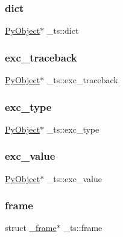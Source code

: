 \subsubsection{\texorpdfstring{dict}{dict}}
{\footnotesize\ttfamily \mbox{\hyperlink{_python27_2object_8h_aadc84ac7aed2cfa6f20c25f62bf3dac7}{Py\+Object}}$\ast$ \+\_\+ts\+::dict}

\mbox{\label{struct__ts_ae3a9cc8bc03b5715c51c52a677a87552}} 
\subsubsection{\texorpdfstring{exc\_traceback}{exc\_traceback}}
{\footnotesize\ttfamily \mbox{\hyperlink{_python27_2object_8h_aadc84ac7aed2cfa6f20c25f62bf3dac7}{Py\+Object}}$\ast$ \+\_\+ts\+::exc\+\_\+traceback}

\mbox{\label{struct__ts_aef14d4a75d97d3296136822dd1ef439e}} 
\subsubsection{\texorpdfstring{exc\_type}{exc\_type}}
{\footnotesize\ttfamily \mbox{\hyperlink{_python27_2object_8h_aadc84ac7aed2cfa6f20c25f62bf3dac7}{Py\+Object}}$\ast$ \+\_\+ts\+::exc\+\_\+type}

\mbox{\label{struct__ts_a60f5422b5ac39104bf338015fb40900f}} 
\subsubsection{\texorpdfstring{exc\_value}{exc\_value}}
{\footnotesize\ttfamily \mbox{\hyperlink{_python27_2object_8h_aadc84ac7aed2cfa6f20c25f62bf3dac7}{Py\+Object}}$\ast$ \+\_\+ts\+::exc\+\_\+value}

\mbox{\label{struct__ts_a06cc5290746f822f1ef96a87983d0388}} 
\subsubsection{\texorpdfstring{frame}{frame}}
{\footnotesize\ttfamily struct \mbox{\hyperlink{struct__frame}{\+\_\+frame}}$\ast$ \+\_\+ts\+::frame}

